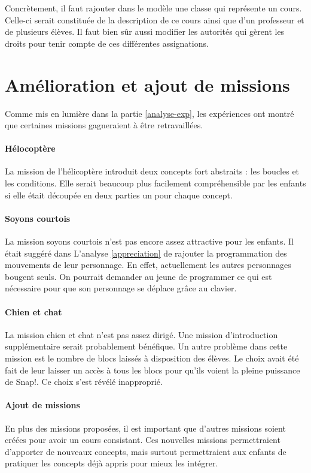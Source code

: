 Concrètement, il faut rajouter dans le modèle une classe qui représente un cours. Celle-ci serait constituée de la description de ce cours ainsi que d'un professeur et de plusieurs élèves. Il faut bien sûr aussi modifier les autorités qui gèrent les droits pour tenir compte de ces différentes assignations.

\section{Amélioration et ajout de missions}
Comme mis en lumière dans la partie \ref{analyse-exp}, les expériences ont montré que certaines missions gagneraient à être retravaillées.

\paragraph{Hélocoptère}
La mission de l'hélicoptère introduit deux concepts fort abstraits : les boucles et les conditions. Elle serait beaucoup plus facilement compréhensible par les enfants si elle était découpée en deux parties un pour chaque concept.

\paragraph{Soyons courtois}
La mission soyons courtois n'est pas encore assez attractive pour les enfants. Il était suggéré dans L'analyse \ref{appreciation} de rajouter la programmation des mouvements de leur personnage. En effet, actuellement les autres personnages bougent seuls. On pourrait demander au jeune de programmer ce qui est nécessaire pour que son personnage se déplace grâce au clavier. %

\paragraph{Chien et chat}
La mission chien et chat n'est pas assez dirigé. Une mission d'introduction supplémentaire serait probablement bénéfique. Un autre problème dans cette mission est le nombre de blocs laissés à disposition des élèves. Le choix avait été fait de leur laisser un accès à tous les blocs pour qu'ils voient la pleine puissance de Snap!. Ce choix s'est révélé inapproprié.

\paragraph{Ajout de missions}
En plus des missions proposées, il est important que d'autres missions soient créées pour avoir un cours consistant. Ces nouvelles missions permettraient d'apporter de nouveaux concepts, mais surtout permettraient aux enfants de pratiquer les concepts déjà appris pour mieux les intégrer.


